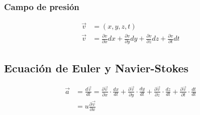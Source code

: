 \subsubsection{Campo de presión}


\[
    \begin{split}
        \Vec{v} & = (x, y, z, t) \\
        \Vec{v} & = \frac{ \partial v }{ \partial x } dx + \frac{ \partial v }{ \partial y } dy + \frac{ \partial v }{ \partial z } dz + \frac{ \partial v }{ \partial t } dt
    \end{split}
\]

\subsection{Ecuación de Euler y Navier-Stokes}
\[
    \begin{split}
        \vec{a} & = \frac{ d\vec{v} }{ dt } = \frac{ \partial \vec{v} }{ \partial x } \cdot \frac{ dx }{ dt } + \frac{ \partial \vec{v} }{ \partial y } \cdot \frac{ dy }{ dt } + \frac{ \partial \vec{v} }{ \partial z } \cdot \frac{ dz }{ dt } +\frac{ \partial \vec{v} }{ \partial t } \cdot \frac{ dt }{ dt } \\
        & = u \frac{ \partial \vec{v} }{ \partial x }
    \end{split}
\]